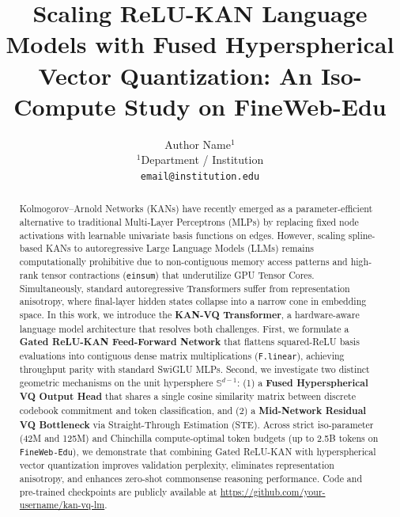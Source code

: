 \documentclass[11pt,a4paper]{article}
\title{\textbf{Scaling ReLU-KAN Language Models with Fused Hyperspherical Vector Quantization: An Iso-Compute Study on FineWeb-Edu}}
\author{
  Author Name$^{1}$ \\
  $^{1}$Department / Institution \\
  \texttt{email@institution.edu}
}
\date{}
\newcommand{\Sphere}{\mathbb{S}^{d-1}}
\begin{document}
\maketitle

\begin{abstract}
Kolmogorov--Arnold Networks (KANs) have recently emerged as a parameter-efficient alternative to traditional Multi-Layer Perceptrons (MLPs) by replacing fixed node activations with learnable univariate basis functions on edges. However, scaling spline-based KANs to autoregressive Large Language Models (LLMs) remains computationally prohibitive due to non-contiguous memory access patterns and high-rank tensor contractions (\texttt{einsum}) that underutilize GPU Tensor Cores. Simultaneously, standard autoregressive Transformers suffer from representation anisotropy, where final-layer hidden states collapse into a narrow cone in embedding space. In this work, we introduce the \textbf{KAN-VQ Transformer}, a hardware-aware language model architecture that resolves both challenges. First, we formulate a \textbf{Gated ReLU-KAN Feed-Forward Network} that flattens squared-ReLU basis evaluations into contiguous dense matrix multiplications (\texttt{F.linear}), achieving throughput parity with standard SwiGLU MLPs. Second, we investigate two distinct geometric mechanisms on the unit hypersphere $\Sphere$: (1) a \textbf{Fused Hyperspherical VQ Output Head} that shares a single cosine similarity matrix between discrete codebook commitment and token classification, and (2) a \textbf{Mid-Network Residual VQ Bottleneck} via Straight-Through Estimation (STE). Across strict iso-parameter (42M and 125M) and Chinchilla compute-optimal token budgets (up to 2.5B tokens on \texttt{FineWeb-Edu}), we demonstrate that combining Gated ReLU-KAN with hyperspherical vector quantization improves validation perplexity, eliminates representation anisotropy, and enhances zero-shot commonsense reasoning performance. Code and pre-trained checkpoints are publicly available at \url{https://github.com/your-username/kan-vq-lm}.
\end{abstract}

\end{document}
